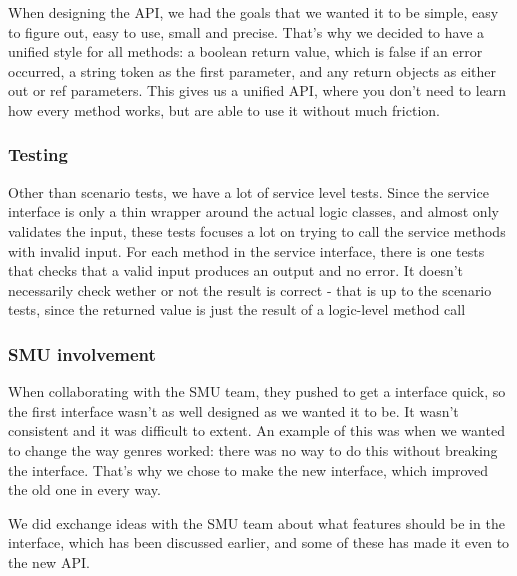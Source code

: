 When designing the API, we had the goals that we wanted it to be simple, easy to figure out, easy to use, small and precise. That's why we decided to have a unified style for all methods: a boolean return value, which is false if an error occurred, a string token as the first parameter, and any return objects as either out or ref parameters. This gives us a unified API, where you don't need to learn how every method works, but are able to use it without much friction.

\subsubsection{Testing}
Other than scenario tests, we have a lot of service level tests. Since the service interface is only a thin wrapper around the actual logic classes, and almost only validates the input, these tests focuses a lot on trying to call the service methods with invalid input. For each method in the service interface, there is one tests that checks that a valid input produces an output and no error. It doesn't necessarily check wether or not the result is correct - that is up to the scenario tests, since the returned value is just the result of a logic-level method call

\subsubsection{SMU involvement}
\label{Design_Service_Interface_SMU}
When collaborating with the SMU team, they pushed to get a interface quick, so the first interface wasn't as well designed as we wanted it to be. It wasn't consistent and it was difficult to extent. An example of this was when we wanted to change the way genres worked: there was no way to do this without breaking the interface. That's why we chose to make the new interface, which improved the old one in every way.

We did exchange ideas with the SMU team about what features should be in the interface, which has been discussed earlier, and some of these has made it even to the new API.
